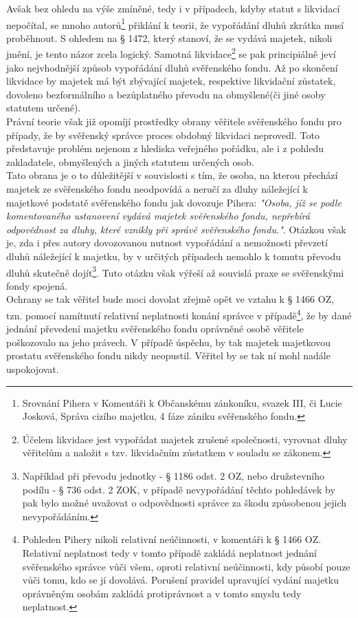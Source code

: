 \documentclass{article}
\begin{document}

Avšak bez ohledu na výše zmíněné, tedy i v případech, kdyby statut s likvidací nepočítal, se mnoho autorů\footnote{Srovnání Pihera v Komentáři k Občanskému zánkoníku, svazek III, či Lucie Josková, Správa cizího majetku, 4 fáze zániku svěřenského fondu.} přiklání k teorii, že vypořádání dluhů zkrátka musí proběhnout. S ohledem na § 1472, který stanoví, že se vydává majetek, nikoli jmění, je tento názor zcela logický. Samotná likvidace\footnote{Účelem likvidace jest vypořádat majetek zrušené společnosti, vyrovnat dluhy věřitelům a naložit s tzv. likvidačním zůstatkem v souladu se zákonem.} se pak principiálně jeví jako nejvhodnější způsob vypořádání dluhů svěřenského fondu. Až po skončení likvidace by majetek má být zbývající majetek, respektive likvidační zůstatek, dovoleno bezformálního a bezůplatného převodu na obmyšlené(či jiné osoby statutem určené).\\

Právní teorie však již opomíjí prostředky obrany věřitele svěřenského fondu pro případy, že by svěřenský správce proces obdobný likvidaci neprovedl. Toto představuje problém nejenom z hlediska veřejného pořádku, ale i z pohledu zakladatele, obmyšlených a jiných statutem určených osob.\\

Tato obrana je o to důležitější v souvislosti s tím, že osoba, na kterou přechází majetek ze svěřenského fondu neodpovídá a neručí za dluhy náležející k majetkové podstatě svěřenského fondu jak dovozuje Pihera: \textit{"Osoba, jíž se podle komentovaného ustanovení vydává majetek svěřenského fondu, nepřebírá odpovědnost za dluhy, které vznikly při správě svěřenského fondu."}. Otázkou však je, zda i přes autory dovozovanou nutnost vypořádání a nemožnosti převzetí dluhů náležející k majetku, by v určitých případech nemohlo k tomutu převodu dluhů skutečně dojít\footnote{Například při převodu jednotky - § 1186 odst. 2 OZ, nebo družstevního podílu - § 736 odst. 2 ZOK, v případě nevypořádání těchto pohledávek by pak bylo možné uvažovat o odpovědnosti správce za škodu způsobenou jejich nevypořádáním.}. Tuto otázku však výřeší až souvislá praxe se svěřenskými fondy spojená.\\

Ochrany se tak věřitel bude moci dovolat zřejmě opět ve vztahu k § 1466 OZ, tzn. pomocí namítnutí relativní neplatnosti konání správce v případě\footnote{Pohleden Pihery nikoli relativní neúčinnosti, v komentáři k § 1466 OZ. Relativní neplatnost tedy v tomto případě zakládá neplatnost jednání svěřenského správce vůči všem, oproti relativní neúčinnosti, kdy působí pouze vůči tomu, kdo se jí dovolává. Porušení pravidel upravující vydání majetku oprávněným osobám zakládá protiprávnost a v tomto smyslu tedy neplatnost.}, že by dané jednání převedení majetku svěřenského fondu oprávněné osobě věřitele poškozovalo na jeho právech. V případě úspěchu, by tak majetek majetkovou prostatu svěřenského fondu nikdy neopustil. Věřitel by se tak ní mohl nadále uspokojovat.\\
\end{document}
